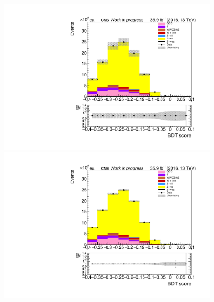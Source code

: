 \begin{figure}[htp]
	\centering

	\begin{multicols}{2}
		\includegraphics[width=\linewidth]{plots/em/DY_CR_prefit.pdf}\par 
		\includegraphics[width=\linewidth]{plots/em/DY_CR_postfit.pdf}\par
	\end{multicols}


\end{figure}
